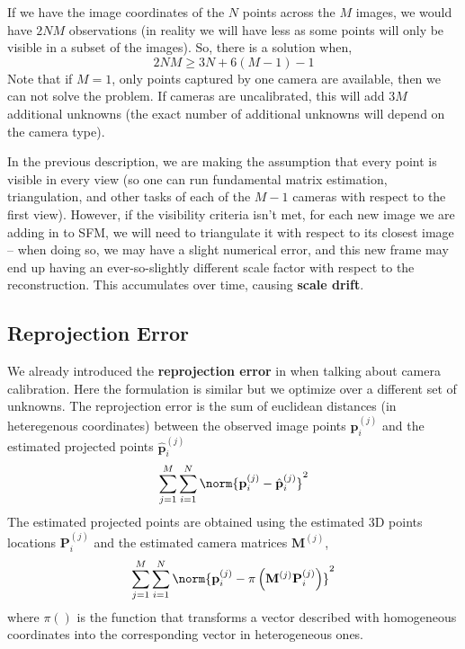 If we have the image coordinates of the $N$ points across the $M$ images, we would have $2NM$ observations (in reality we will have less as some points will only be visible in a subset of the images). So, there is a solution when,
\begin{equation}
    2NM \geq 3N + 6(M-1)-1
\end{equation}
Note that if $M=1$, only points captured by one camera are available, then we can not solve the problem. If cameras are uncalibrated, this will add $3M$ additional unknowns (the exact number of additional unknowns will depend on the camera type).

In the previous description, we are making the assumption that every point is visible in every view (so one can run fundamental matrix estimation, triangulation, and other tasks of each of the $M-1$ cameras with respect to the first view). However, if the visibility criteria isn’t met, for each new image we are adding in to SFM, we will need to triangulate it with respect to its closest image -- when doing so, we may have a slight numerical error, and this new frame may end up having an ever-so-slightly different scale factor with respect to the reconstruction. This accumulates over time, causing {\bf scale drift}.


\subsection{Reprojection Error}


We already introduced the {\bf reprojection error} in \sect{\ref{sec:cam_cal_minimizing_reprojection_error}} when talking about camera calibration. Here the formulation is similar but we optimize over a different set of unknowns. %
The reprojection error is the sum of euclidean distances (in heteregenous coordinates) between the observed image points $\mathbf{p}^{(j)}_i$ and the estimated projected points $\hat{\mathbf{p}}^{(j)}_i$
\begin{equation}
    \sum_{j=1}^M \sum_{i=1}^N
    \norm{
        \mathbf{p}^{(j)}_i - \hat{\mathbf{p}}^{(j)}_i
    }
    ^2
\end{equation}
The estimated projected points are obtained using the estimated 3D points locations $\mathbf{P}^{(j)}_i$ and the estimated camera matrices $\mathbf{M}^{(j)}$,
\begin{equation}
    \sum_{j=1}^M \sum_{i=1}^N
    \norm{
        \mathbf{p}^{(j)}_i -
        \pi \left(
        \mathbf{M}^{(j)} \mathbf{P}^{(j)}_i
        \right)
    } ^2
    \label{eq:sfm:rep_error}
\end{equation}
where $\pi()$ is the function that transforms a vector described with homogeneous coordinates into the corresponding vector in heterogeneous ones.

